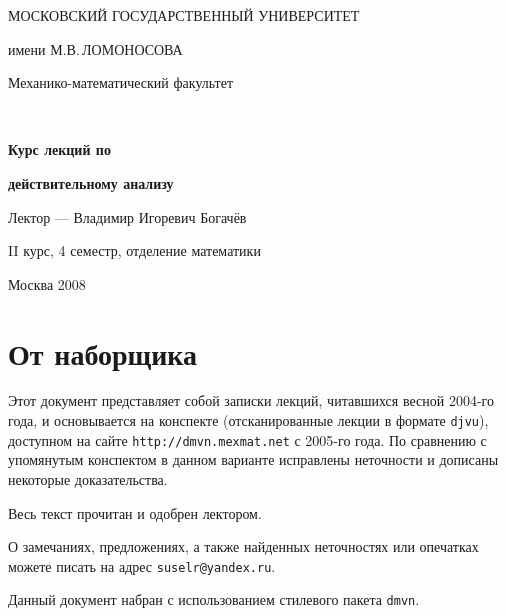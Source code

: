 \documentclass[10pt]{article}
\begin{document}
\renewcommand{\contentsname}{Оглавление}

\begin{titlepage}

\begin{center}

\vskip40pt

{\Large МОСКОВСКИЙ ГОСУДАРСТВЕННЫЙ УНИВЕРСИТЕТ

\medskip

имени М.В.\,ЛОМОНОСОВА

\bigskip

Механико-математический факультет}

\par\vskip30pt

\\ %

\vskip30pt

{\huge\textbf{\textsf{Курс лекций по}}}

\medskip

{\huge\textbf{\textsf{действительному анализу}}}

\bigskip

{\large\textsf{Лектор --- Владимир Игоревич Богачёв}}

\vskip50pt

{\Large II курс, 4 семестр, отделение математики}

\vfill

{\large Москва 2008}

\end{center}

\end{titlepage}


\section*{От наборщика}

Этот документ представляет собой записки лекций, читавшихся весной
2004-го года, и основывается на конспекте (отсканированные лекции в
формате \texttt{djvu}), доступном на сайте
\texttt{http://dmvn.mexmat.net} с 2005-го года. По сравнению с
упомянутым конспектом в данном варианте исправлены неточности и
дописаны некоторые доказательства.

Весь текст прочитан и одобрен лектором.

О замечаниях, предложениях, а также найденных неточностях или
опечатках можете писать на адрес \texttt{suselr@yandex.ru}.

Данный документ набран с использованием стилевого пакета
\texttt{dmvn}.
\end{document}
